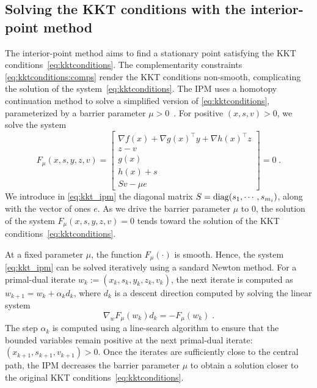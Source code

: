\subsection{Solving the KKT conditions with the interior-point method}
\label{sec:ipm:kkt}
The interior-point method aims to find a stationary point
satisfying the KKT conditions~\eqref{eq:kktconditions}.
The complementarity constraints \eqref{eq:kktconditions:comps}
render the KKT conditions non-smooth, complicating the solution of
the system~\eqref{eq:kktconditions}.
The IPM uses a homotopy continuation method to solve a simplified
version of \eqref{eq:kktconditions}, parameterized by a barrier
parameter $\mu > 0$~\cite[Chapter 19]{nocedal_numerical_2006}.
For positive $(x, s, v) > 0$, we solve the system
\begin{equation}
  \label{eq:kkt_ipm}
  F_\mu(x, s, y, z, v) =
  \begin{bmatrix}
       \nabla f(x) + \nabla g(x)^\top y + \nabla h(x)^\top z   \\
       z - v  \\
       g(x)  \\
       h(x) + s  \\
       S v - \mu e
  \end{bmatrix} = 0
   \; .
\end{equation}
We introduce in \eqref{eq:kkt_ipm} the diagonal matrix
$S = \operatorname{diag}(s_1, \cdots, s_{m_i})$, along with the vector of ones $e$.
As we drive the barrier parameter $\mu$ to $0$, the solution of the
system $F_\mu(x, s, y, z, v) = 0$ tends toward the solution of the
KKT conditions~\eqref{eq:kktconditions}.

At a fixed parameter $\mu$, the function $F_\mu(\cdot)$ is smooth. Hence, the system \eqref{eq:kkt_ipm} can be solved iteratively
using a sandard Newton method. For a primal-dual iterate
$w_k := (x_k, s_k, y_k, z_k, v_k)$, the next iterate is computed as
$w_{k+1} = w_k + \alpha_k d_k$, where $d_k$ is a descent
direction computed by solving the linear system
\begin{equation}
  \label{eq:newton_step}
  \nabla_w F_{\mu}(w_k) d_k = -F_{\mu}(w_k) \; .
\end{equation}
The step $\alpha_k$ is computed using a line-search algorithm
to ensure that the bounded variables remain positive
at the next primal-dual iterate: $(x_{k+1}, s_{k+1}, v_{k+1}) > 0$.
Once the iterates are sufficiently close to the central path,
the IPM decreases the barrier parameter $\mu$ to obtain a solution closer to
the original KKT conditions~\eqref{eq:kktconditions}.

